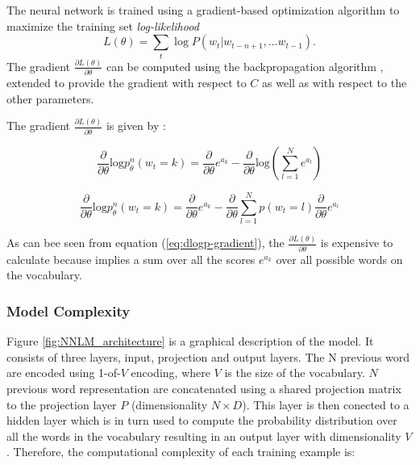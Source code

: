 The neural network is trained using a gradient-based optimization algorithm
to maximize the training set \textit{log-likelihood}
\begin{equation}
 L(\theta) = \sum_t \log P(w_t | w_{t-n+1}, \ldots w_{t-1}) .
\end{equation}
The gradient $\frac{\partial L(\theta)}{\partial \theta}$
can be computed using the backpropagation algorithm \cite{Bishop:1995:NNP:525960}, extended
to provide the gradient with respect to $C$ as well as with
respect to the other parameters. 



The gradient   $\frac{\partial L(\theta)}{\partial
  \theta}$   is given by  :



\begin{equation*}
  \label{eq:nnlm-grad}
  \frac{\partial }{\partial \theta}\text{log}p_{\theta}^{n}(w_t=k) =
  \frac{\partial }{\partial \theta} e^{a_k} -  \frac{\partial }{\partial
    \theta}\text{log} \left( \sum_{l=1}^N e^{a_l} \right)
 \end{equation*}

\begin{equation}
\label{eq:dlogp-gradient}
  \frac{\partial }{\partial \theta}\text{log}p_{\theta}^{n}(w_t=k)  =  \frac{\partial }{\partial \theta} e^{a_k}  -   \frac{\partial }{\partial
    \theta}  \sum_{l=1}^N  p(w_t = l)  \frac{\partial }{\partial
    \theta}  e^{a_l}   
\end{equation}


As can bee seen from equation (\ref{eq:dlogp-gradient}), the  $\frac{\partial L(\theta)}{\partial
  \theta}$ is  expensive to calculate because implies a sum over all the scores $e^{a_{k}}$ over all possible words on the vocabulary.


\subsubsection{Model Complexity}
\label{sec:sub:sub:bengio_nnlm_complexity}

Figure \ref{fig:NNLM_architecture} is a graphical description of  the model.
It consists of three layers, input, projection and output layers. The N
previous word are encoded using 1-of-$V$ encoding, where $V$ is the size
of the vocabulary. $N$ previous word representation are concatenated using a
shared projection matrix to the projection layer $P$ (dimensionality $N
\times D$).  This layer is then conected to a hidden layer which is in turn
used to compute the probability distribution over all the words in the
vocabulary resulting in an output layer with dimensionality $V$. Therefore,
the computational complexity of each training example is:

